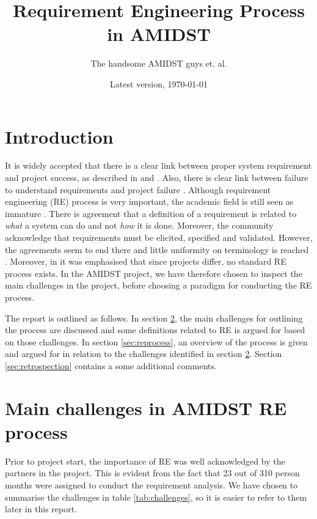 \documentclass[11pt, oneside]{article}   	%
\title{Requirement Engineering Process in AMIDST}
\author{The handsome AMIDST guys et. al.}
\date{Latest version, \today}							%
\begin{document}
\maketitle
%
%
\section{Introduction}

It is widely accepted that there is a clear link between proper system requirement and project success, as described in  \cite{Boe91} and \cite{Jac99}.  Also, there is clear link between failure to understand requirements and project failure \cite{Ewu03}.  Although requirement engineering (RE) process is very important, the academic field is still seen as immature \cite{Poh96}. There is agreement that a definition of a requirement is related to \emph{what} a system can do and not \emph{how} it is done.  Moreover, the community acknowledge that requirements must be elicited, specified and validated.  However, the agreements seem to end there and little uniformity on terminology is reached \cite{Poh96}.  Moreover, in \cite{Ebe10} it was emphasised that since projects differ, no standard RE process exists.  In the AMIDST project, we have therefore chosen to inspect the main challenges in the project, before choosing a paradigm for conducting the RE process.

The report is outlined as follows.  In section \ref{sec:challenges}, the main challenges for outlining the process are discussed and some definitions related to RE is argued for based on those challenges.  In section \ref{sec:reprocess}, an overview of the process is given and argued for in relation to the challenges identified in section \ref{sec:challenges}.  Section \ref{sec:retrospection} contains a some additional comments.

\section{Main challenges in AMIDST RE process}
\label{sec:challenges}

Prior to project start, the importance of RE was well acknowledged by the partners in the project.  This is evident from the fact that 23 out of 310 person months were assigned to conduct the requirement analysis.  We have chosen to summarise the challenges in table \ref{tab:challenges}, so it is easier to refer to them later in this report.
\end{document}
